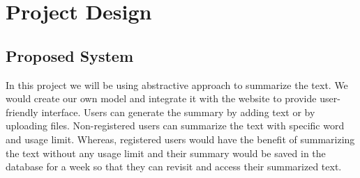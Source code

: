 \chapter{Project Design}

\section{Proposed System}
In this project we will be using abstractive approach to summarize the text. We would create our own model and integrate it with the website to provide user-friendly interface. 
Users can generate the summary by adding text or by uploading files.  
Non-registered users can summarize the text with specific word and usage limit.
Whereas, registered users would have the benefit of summarizing the text without any usage limit and their summary would be saved in the database for a week so that they can revisit and access their summarized text.

